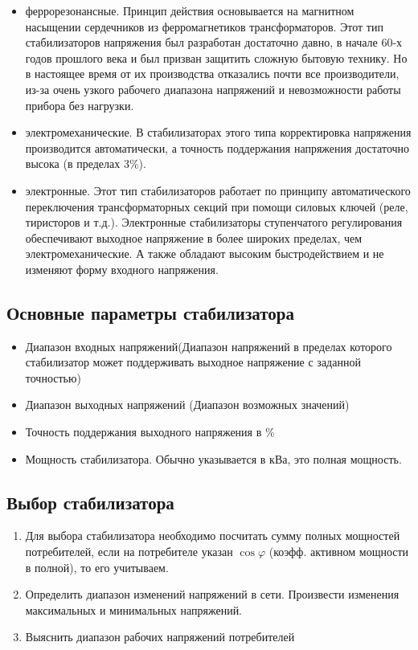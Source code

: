 \begin{itemize}
\item феррорезонансные. Принцип действия основывается на магнитном насыщении сердечников из ферромагнетиков трансформаторов. Этот тип стабилизаторов напряжения был разработан достаточно давно, в начале 60-х годов прошлого века и был призван защитить сложную бытовую технику. Но в настоящее время от их производства отказались почти все производители, из-за очень узкого рабочего диапазона напряжений и невозможности работы прибора без нагрузки.
\item электромеханические. В стабилизаторах этого типа корректировка напряжения производится автоматически, а точность поддержания напряжения достаточно высока (в пределах 3\%).
\item электронные. Этот тип стабилизаторов работает по принципу автоматического переключения трансформаторных секций при помощи силовых ключей (реле, тиристоров и т.д.). Электронные стабилизаторы ступенчатого регулирования обеспечивают выходное напряжение в более широких пределах, чем электромеханические. А также обладают высоким быстродействием и не изменяют форму входного напряжения.
\end{itemize}

\subsection*{Основные параметры стабилизатора}

\begin{itemize}
\item Диапазон входных напряжений(Диапазон напряжений в пределах которого стабилизатор может поддерживать выходное напряжение с заданной точностью)
\item Диапазон  выходных напряжений (Диапазон возможных значений)
\item Точность поддержания выходного напряжения в \%
\item Мощность стабилизатора. Обычно указывается в кВа, это полная мощность.
\end{itemize}

\subsection*{Выбор стабилизатора}

\begin{enumerate}
\item Для выбора стабилизатора необходимо посчитать сумму полных мощностей потребителей, если на потребителе указан $\cos\varphi$ (коэфф. активном мощности в полной), то его учитываем.
\item Определить диапазон изменений напряжений в сети. Произвести изменения максимальных и минимальных напряжений.
\item Выяснить диапазон рабочих напряжений потребителей
\end{enumerate}


